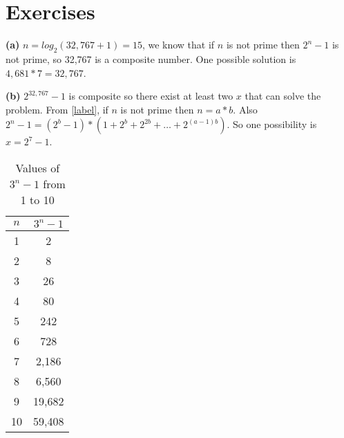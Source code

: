 \section{Exercises}


\sol \textbf{(a)} $n = log_2(32,767+1) = 15$, we know that if $n$ is not prime then $2^n - 1$ is not prime, so 32,767 is a composite number. 
One possible solution is $4,681 * 7 = 32,767$.

\sol \textbf{(b)} $2^{32,767} - 1$ is composite so there exist at least two $x$ that can solve the problem.
From \ref{label}, if $n$ is not prime then $n = a*b$.
Also $2^n - 1 = (2^b - 1) * (1 + 2^b + 2^{2b} + \ldots + 2^{(a-1)b})$.
So one possibility is $x = 2^7 - 1$.


\sol \begin{table}[h]
  \centering
  \label{tab:3n_minus_1}
  \begin{tabular}{|c|c|}
    \hline
    $n$ & $3^n - 1$\\
    \hline
    1 & 2\\
    2 & 8\\
    3 & 26\\
    4 & 80\\
    5 & 242\\
    6 & 728\\
    7 & 2,186\\
    8 & 6,560\\
    9 & 19,682\\
    10 & 59,408\\
    \hline
  \end{tabular}
  \caption{Values of $3^n - 1$ from 1 to 10}
\end{table}


